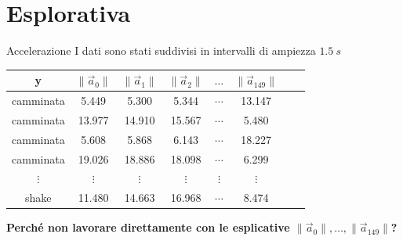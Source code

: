 \documentclass{beamer}
\begin{document}
\section{Esplorativa}
\begin{frame}{Accelerazione}
I dati sono stati suddivisi in intervalli di ampiezza $\SI{1.5}{s}$
\begin{table}[H]
\begin{tabular}{cccccccc}
\toprule
y & $\|\vec{a}_0\|$ & $\|\vec{a}_1\|$ & $\|\vec{a}_2\|$  & $\dots$ & $\|\vec{a}_{149}\|$\\
\midrule
camminata & 5.449 & 5.300 & 5.344 &  $\cdots$ & 13.147\\
camminata & 13.977 & 14.910 & 15.567 &  $\cdots$ & 5.480\\
camminata & 5.608 & 5.868 & 6.143 &  $\cdots$ & 18.227\\
camminata & 19.026 & 18.886 & 18.098 &  $\cdots$ & 6.299\\
$\vdots$ & $\vdots$ & $\vdots$ & $\vdots$ &  $\vdots$ & $\vdots$\\
shake & 11.480 & 14.663 & 16.968 &  $\cdots$ & 8.474\\
\bottomrule
\end{tabular}
\end{table}
\begin{center}
\pause \textbf{Perché non lavorare direttamente con le esplicative $\|\vec{a}_0\|,\dots,\|\vec{a}_{149}\|$?}
\end{center}
\end{frame}
\end{document}
